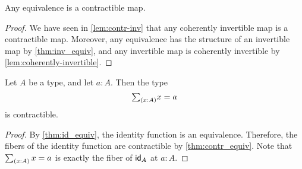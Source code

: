 \begin{thm}\label{thm:contr_equiv}
Any equivalence is a contractible map.
\end{thm}

\begin{proof}
  We have seen in \cref{lem:contr-inv} that any coherently invertible map is a contractible map. Moreover, any equivalence has the structure of an invertible map by \cref{thm:inv_equiv}, and any invertible map is coherently invertible by \cref{lem:coherently-invertible}.
\end{proof}

\begin{cor}\label{cor:contr_path}
Let $A$ be a type, and let $a:A$. Then the type
\begin{equation*}
\sm{x:A}x=a
\end{equation*}
is contractible.
\end{cor}

\begin{proof}
By \cref{thm:id_equiv}, the identity function is an equivalence. Therefore, the fibers of the identity function are contractible by \cref{thm:contr_equiv}. Note that $\sm{x:A}x=a$ is exactly the fiber of $\idfunc[A]$ at $a:A$.
\end{proof}

